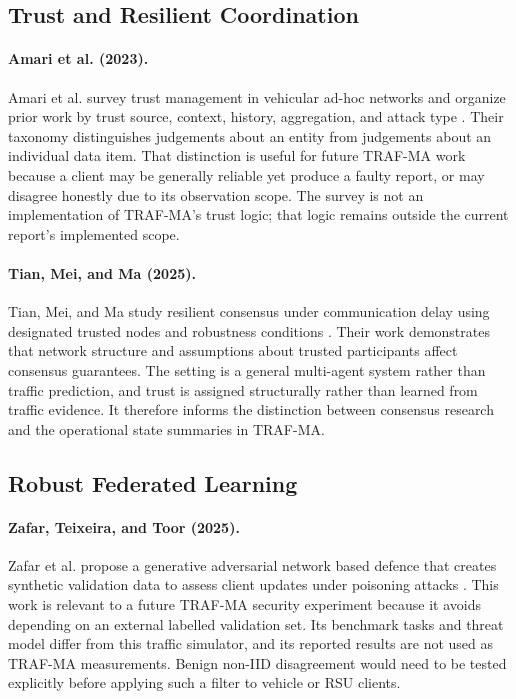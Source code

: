 \subsection{Trust and Resilient Coordination}
\paragraph{Amari et al. (2023).}
Amari et al. survey trust management in vehicular ad-hoc networks and organize prior work by trust source, context, history, aggregation, and attack type \cite{amari2023}. Their taxonomy distinguishes judgements about an entity from judgements about an individual data item. That distinction is useful for future TRAF-MA work because a client may be generally reliable yet produce a faulty report, or may disagree honestly due to its observation scope. The survey is not an implementation of TRAF-MA's trust logic; that logic remains outside the current report's implemented scope.

\paragraph{Tian, Mei, and Ma (2025).}
Tian, Mei, and Ma study resilient consensus under communication delay using designated trusted nodes and robustness conditions \cite{tian2025}. Their work demonstrates that network structure and assumptions about trusted participants affect consensus guarantees. The setting is a general multi-agent system rather than traffic prediction, and trust is assigned structurally rather than learned from traffic evidence. It therefore informs the distinction between consensus research and the operational state summaries in TRAF-MA.

\subsection{Robust Federated Learning}
\paragraph{Zafar, Teixeira, and Toor (2025).}
Zafar et al. propose a generative adversarial network based defence that creates synthetic validation data to assess client updates under poisoning attacks \cite{zafar2025}. This work is relevant to a future TRAF-MA security experiment because it avoids depending on an external labelled validation set. Its benchmark tasks and threat model differ from this traffic simulator, and its reported results are not used as TRAF-MA measurements. Benign non-IID disagreement would need to be tested explicitly before applying such a filter to vehicle or RSU clients.


